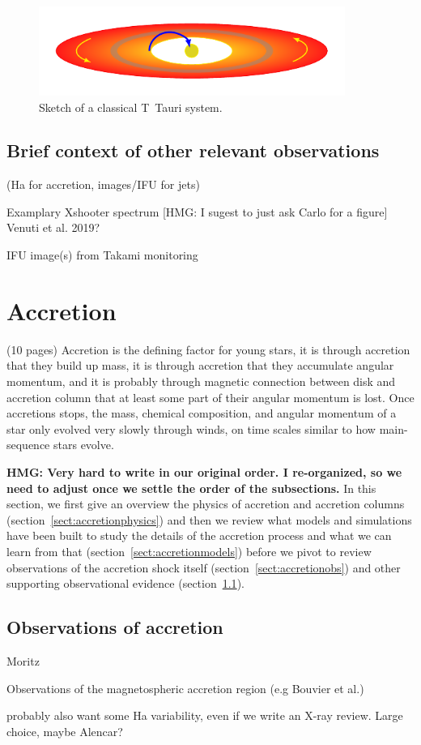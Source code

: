 \documentclass[graybox, nosecnum]{svmult}
\begin{document}
\begin{figure}[t]
\centering
\includegraphics[width=10cm]{sketches/ctts.pdf}
\caption{Sketch of a classical T~Tauri system. \label{fig:ctts_sketch}}
\end{figure}


\subsection{Brief context of other relevant observations}
{\color{blue}(Ha for accretion, images/IFU for jets)

Examplary Xshooter spectrum [HMG: I sugest to just ask Carlo for a figure] Venuti et al. 2019?

        IFU image(s) from Takami monitoring
}
\section{Accretion}
{\color{blue}(10 pages)}
Accretion is the defining factor for young stars, it is through accretion that they build up mass, it is through accretion that they accumulate angular momentum, and it is probably through magnetic connection between disk and accretion column that at least some part of their angular momentum is lost. Once accretions stops, the mass, chemical composition, and angular momentum of a star only evolved very slowly through winds, on time scales similar to how main-sequence stars evolve.

\textbf{HMG: Very hard to write in our original order. I re-organized, so we need to adjust once we settle the order of the subsections.}
In this section, we first give an overview the physics of accretion and accretion columns (section~\ref{sect:accretionphysics}) and then we review what models and simulations have been built to study the details of the accretion process and what we can learn from that (section~\ref{sect:accretionmodels}) before we pivot to review observations of the accretion shock itself (section~\ref{sect:accretionobs}) and other supporting observational evidence (section~\ref{sect:accretionsupportingobs}).



\subsection{Observations of accretion}
\label{sect:accretionsupportingobs}
{\color{blue}           Moritz

 Observations of the magnetospheric accretion region (e.g Bouvier et al.)
 
 probably also want some Ha variability, even if we write an X-ray review. Large choice, maybe Alencar?
}
\end{document}
